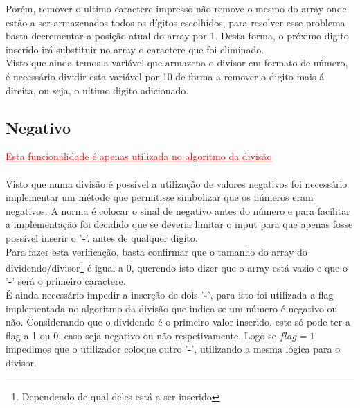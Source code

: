 Porém, remover o ultimo caractere impresso não remove o mesmo do array onde estão a ser armazenados todos os dígitos escolhidos, para resolver esse problema basta decrementar a posição atual do array por 1. Desta forma, o próximo digito inserido irá substituir no array o caractere que foi eliminado. \\

Visto que ainda temos a variável que armazena o divisor em formato de número, é necessário dividir esta variável por 10 de forma a remover o digito mais á direita, ou seja, o ultimo digito adicionado.

\titleformat{\subsection}[runin]
{\normalfont\large\bfseries}{\thesubsection}{1em}{}
\subsection{Negativo} \hfill \textcolor{red}{\underline{Esta funcionalidade é apenas utilizada no algoritmo da divisão}}\\ \\
Visto que numa divisão é possível a utilização de valores negativos foi necessário implementar um método que permitisse simbolizar que os números eram negativos. A norma é colocar o sinal de negativo antes do número e para facilitar a implementação foi decidido que se deveria limitar o input para que apenas fosse possível inserir o '\textbf{-}'. antes de qualquer digito.\\

Para fazer esta verificação, basta confirmar que o tamanho do array do dividendo/divisor\footnote{Dependendo de qual deles está a ser inserido} é igual a 0, querendo isto dizer que o array está vazio e que o '\textbf{-}' será o primeiro caractere.\\

É ainda necessário impedir a inserção de dois '\textbf{-}', para isto foi utilizada a flag implementada no algoritmo da divisão que indica se um número é negativo ou não. Considerando que o dividendo é o primeiro valor inserido, este só pode ter a flag a 1 ou 0, caso seja negativo ou não respetivamente. Logo se $flag = 1$ impedimos que o utilizador coloque outro '\textbf{-}', utilizando a mesma lógica para o divisor.


\titleformat{\subsection}[block]
{\normalfont\large\bfseries}{\thesubsection}{1em}{}


